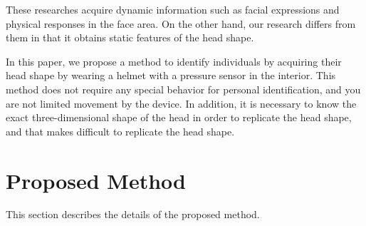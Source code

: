 \documentclass[sigchi,authordraft]{acmart}
\begin{document}

These researches acquire dynamic information such as facial expressions and physical responses in the face area. On the other hand, our research differs from them in that it obtains static features of the head shape.\par


In this paper, we propose a method to identify individuals by acquiring their head shape by wearing a helmet with a pressure sensor in the interior. This method does not require any special behavior for personal identification, and you are not limited movement by the device. In addition, it is necessary to know the exact three-dimensional shape of the head in order to replicate the head shape, and that makes difficult to replicate the head shape.


\section{Proposed Method}
\label{sec:method}
This section describes the details of the proposed method.
\end{document}
